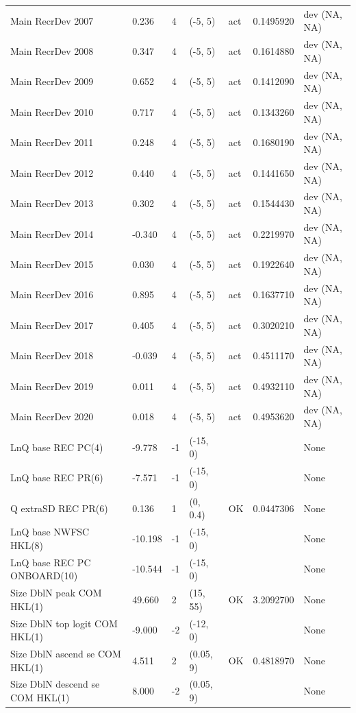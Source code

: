 \documentclass[
  english,
  a4paper,
]{article}
\begin{document}
\begin{landscape}
\begin{longtable}[t]{lllllll}
Main RecrDev 2007 & 0.236 & 4 & (-5, 5) & act & 0.1495920 & dev (NA, NA)\\
\addlinespace
Main RecrDev 2008 & 0.347 & 4 & (-5, 5) & act & 0.1614880 & dev (NA, NA)\\
Main RecrDev 2009 & 0.652 & 4 & (-5, 5) & act & 0.1412090 & dev (NA, NA)\\
Main RecrDev 2010 & 0.717 & 4 & (-5, 5) & act & 0.1343260 & dev (NA, NA)\\
Main RecrDev 2011 & 0.248 & 4 & (-5, 5) & act & 0.1680190 & dev (NA, NA)\\
Main RecrDev 2012 & 0.440 & 4 & (-5, 5) & act & 0.1441650 & dev (NA, NA)\\
\addlinespace
Main RecrDev 2013 & 0.302 & 4 & (-5, 5) & act & 0.1544430 & dev (NA, NA)\\
Main RecrDev 2014 & -0.340 & 4 & (-5, 5) & act & 0.2219970 & dev (NA, NA)\\
Main RecrDev 2015 & 0.030 & 4 & (-5, 5) & act & 0.1922640 & dev (NA, NA)\\
Main RecrDev 2016 & 0.895 & 4 & (-5, 5) & act & 0.1637710 & dev (NA, NA)\\
Main RecrDev 2017 & 0.405 & 4 & (-5, 5) & act & 0.3020210 & dev (NA, NA)\\
\addlinespace
Main RecrDev 2018 & -0.039 & 4 & (-5, 5) & act & 0.4511170 & dev (NA, NA)\\
Main RecrDev 2019 & 0.011 & 4 & (-5, 5) & act & 0.4932110 & dev (NA, NA)\\
Main RecrDev 2020 & 0.018 & 4 & (-5, 5) & act & 0.4953620 & dev (NA, NA)\\
LnQ base REC PC(4) & -9.778 & -1 & (-15, 0) &  &  & None\\
LnQ base REC PR(6) & -7.571 & -1 & (-15, 0) &  &  & None\\
\addlinespace
Q extraSD REC PR(6) & 0.136 & 1 & (0, 0.4) & OK & 0.0447306 & None\\
LnQ base NWFSC HKL(8) & -10.198 & -1 & (-15, 0) &  &  & None\\
LnQ base REC PC ONBOARD(10) & -10.544 & -1 & (-15, 0) &  &  & None\\
Size DblN peak COM HKL(1) & 49.660 & 2 & (15, 55) & OK & 3.2092700 & None\\
Size DblN top logit COM HKL(1) & -9.000 & -2 & (-12, 0) &  &  & None\\
\addlinespace
Size DblN ascend se COM HKL(1) & 4.511 & 2 & (0.05, 9) & OK & 0.4818970 & None\\
Size DblN descend se COM HKL(1) & 8.000 & -2 & (0.05, 9) &  &  & None\\

\end{longtable}
\end{landscape}
\end{document}

